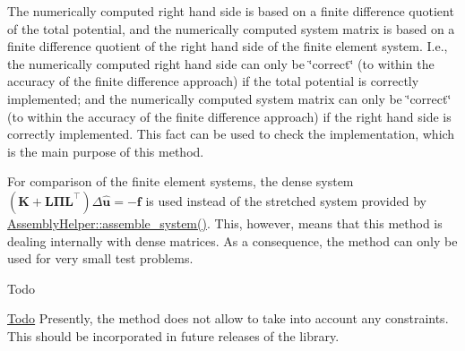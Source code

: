 The numerically computed right hand side is based on a finite difference quotient of the total potential, and the numerically computed system matrix is based on a finite difference quotient of the right hand side of the finite element system. I.\+e., the numerically computed right hand side can only be \char`\"{}correct\char`\"{} (to within the accuracy of the finite difference approach) if the total potential is correctly implemented; and the numerically computed system matrix can only be \char`\"{}correct\char`\"{} (to within the accuracy of the finite difference approach) if the right hand side is correctly implemented. This fact can be used to check the implementation, which is the main purpose of this method.

For comparison of the finite element systems, the dense system $\left( \boldsymbol{K} + \boldsymbol{L} \boldsymbol{\Pi} \boldsymbol{L}^\top \right) \Delta\boldsymbol{\hat u} = - \boldsymbol{f}$ is used instead of the stretched system provided by \hyperlink{class_assembly_helper_a9d2f3d1152046e639acfa6f6ac317b37}{Assembly\+Helper\+::assemble\+\_\+system()}. This, however, means that this method is dealing internally with dense matrices. As a consequence, the method can only be used for very small test problems.

\begin{DoxyRefDesc}{Todo}
\item[\hyperlink{todo__todo000005}{Todo}]Presently, the method does not allow to take into account any constraints. This should be incorporated in future releases of the library.\end{DoxyRefDesc}



